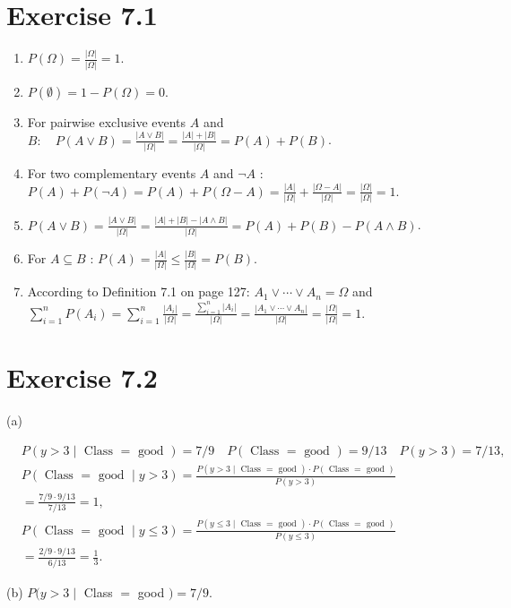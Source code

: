 \documentclass[10pt]{article}
\begin{document}
\section*{Exercise 7.1}
\begin{enumerate}
  \item $P(\Omega)=\frac{|\Omega|}{|\Omega|}=1$.
  \item $P(\emptyset)=1-P(\Omega)=0$.
  \item For pairwise exclusive events $A$ and $B: \quad P(A \vee B)=\frac{|A \vee B|}{|\Omega|}=\frac{|A|+|B|}{|\Omega|}= P(A)+P(B)$.
  \item For two complementary events $A$ and $\neg A$ : $P(A)+P(\neg A)=P(A)+P(\Omega-A)= \frac{|A|}{|\Omega|}+\frac{|\Omega-A|}{|\Omega|}=\frac{|\Omega|}{|\Omega|}=1$.
  \item $P(A \vee B)=\frac{|A \vee B|}{|\Omega|}=\frac{|A|+|B|-|A \wedge B|}{|\Omega|}=P(A)+P(B)-P(A \wedge B)$.
  \item For $A \subseteq B$ : $P(A)=\frac{|A|}{|\Omega|} \leq \frac{|B|}{|\Omega|}=P(B)$.
  \item According to Definition 7.1 on page 127: $A_{1} \vee \cdots \vee A_{n}=\Omega$ and $\sum_{i=1}^{n} P\left(A_{i}\right)= \sum_{i=1}^{n} \frac{\left|A_{i}\right|}{|\Omega|}=\frac{\sum_{i=1}^{n}\left|A_{i}\right|}{|\Omega|}=\frac{\left|A_{1} \vee \cdots \vee A_{n}\right|}{|\Omega|}=\frac{|\Omega|}{|\Omega|}=1$.
\end{enumerate}

\section*{Exercise 7.2}
(a)

$$
\begin{aligned}
& P(y>3 \mid \text { Class }=\text { good })=7 / 9 \quad P(\text { Class }=\text { good })=9 / 13 \quad P(y>3)=7 / 13, \\
& P(\text { Class }=\text { good } \mid y>3)=\frac{P(y>3 \mid \text { Class }=\text { good }) \cdot P(\text { Class }=\text { good })}{P(y>3)} \\
& =\frac{7 / 9 \cdot 9 / 13}{7 / 13}=1, \\
& P(\text { Class }=\text { good } \mid y \leq 3)=\frac{P(y \leq 3 \mid \text { Class }=\text { good }) \cdot P(\text { Class }=\text { good })}{P(y \leq 3)} \\
& =\frac{2 / 9 \cdot 9 / 13}{6 / 13}=\frac{1}{3} .
\end{aligned}
$$

(b) $P(y>3 \mid$ Class $=$ good $)=7 / 9$.
\end{document}
